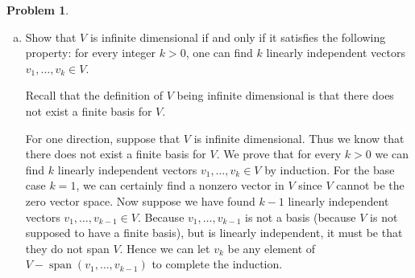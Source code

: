 \documentclass[11pt,oneside]{amsart}
\theoremstyle{definition}
\newtheorem{problem}{Problem}
\DeclareMathOperator{\Span}{span}
\begin{document}
    \begin{problem}
        \leavevmode\begin{enumerate}[(a)]
            \item Show that $V$ is infinite dimensional if and only if it satisfies the following property: for every integer $k>0$, one can find $k$ linearly independent vectors $v_1,\dots,v_k\in V$.
            \begin{solution}
                Recall that the definition of $V$ being infinite dimensional is that there does not exist a finite basis for $V$.

                For one direction, suppose that $V$ is infinite dimensional. Thus we know that there does not exist a finite basis for $V$. We prove that for every $k>0$ we can find $k$ linearly independent vectors $v_1,\dots,v_k\in V$ by induction. For the base case $k=1$, we can certainly find a nonzero vector in $V$ since $V$ cannot be the zero vector space. Now suppose we have found $k-1$ linearly independent vectors $v_1,\dots,v_{k-1}\in V$. Because $v_1,\dots,v_{k-1}$ is not a basis (because $V$ is not supposed to have a finite basis), but is linearly independent, it must be that they do not span $V$. Hence we can let $v_k$ be any element of $V-\Span(v_1,\dots,v_{k-1})$ to complete the induction.


\end{solution}
\end{enumerate}
\end{problem}
\end{document}
